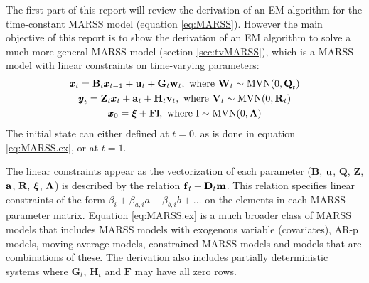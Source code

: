 \documentclass[]{article}
\def\xixi{\mbox{\boldmath $\xi$}}
\def\LAM{\mbox{\boldmath $\Lambda$}}
\def\UPS{\mbox{\boldmath $\Upsilon$}}
\def\XI{\mbox{\boldmath $\Xi$}}
\def\BB{\mbox{$\mathbf B$}}	\def\bb{\mbox{$\mathbf b$}} \def\Bb{\mbox{$\mathbf J$}} \def\Ba{\mbox{$\mathbf L$}} \def\Bm{\UPS}
\def\DD{\mbox{$\mathbf D$}}	\def\dd{\mbox{$\mathbf d$}}
\def\FF{\mbox{$\mathbf F$}} \def\ff{\mbox{$\mathbf f$}}
\def\GG{\mbox{$\mathbf G$}}	\def\gg{\mbox{$\mathbf g$}}
\def\HH{\mbox{$\mathbf H$}}	\def\hh{\mbox{$\mathbf h$}}
\def\QQ{\mbox{$\mathbf Q$}}	 \def\qq{\mbox{$\mathbf q$}} \def\Qb{\mbox{$\mathbf G$}}  \def\Qm{\mathbb{Q}}
\def\RR{\mbox{$\mathbf R$}}	 \def\rr{\mbox{$\mathbf r$}} \def\Rb{\mbox{$\mathbf H$}}	\def\Rm{\mathbb{R}}
\def\VV{\mbox{$\mathbf V$}}	\def\vv{\mbox{$\mathbf v$}}
\def\WW{\mbox{$\mathbf W$}}	\def\ww{\mbox{$\mathbf w$}}
\def\ZZ{\mbox{$\mathbf Z$}}	\def\zz{\mbox{$\mathbf z$}}	\def\Zb{\mbox{$\mathbf M$}} \def\Za{\mbox{$\mathbf N$}} \def\Zm{\XI}
\begin{document}
The first part of this report will review the derivation of an EM algorithm for the time-constant MARSS model (equation \ref{eq:MARSS}).  However the main objective of this report is to show the derivation of an EM algorithm to solve a much more general MARSS model  (section \ref{sec:tvMARSS}), which is a MARSS model with linear constraints on time-varying parameters: 
\begin{equation}\label{eq:MARSS.ex}
\begin{gathered}
\xx_t = \BB_t\xx_{t-1} + \uu_t + \GG_t\ww_t, \text{ where } \WW_t \sim \mathrm{MVN}(0,\QQ_t)\\
\yy_t = \ZZ_t\xx_t + \aa_t + \HH_t\vv_t, \text{ where } \VV_t \sim \mathrm{MVN}(0,\RR_t)\\
\xx_{0} = \xixi + \FF\ll, \text{ where }  \ll \sim \mathrm{MVN}(0,\LAM)
\end{gathered}
\end{equation}
The initial state can either defined at $t=0$, as is done in equation \ref{eq:MARSS.ex}, or at $t=1$.  

The linear constraints appear as the vectorization of each parameter ($\BB$, $\uu$, $\QQ$, $\ZZ$, $\aa$, $\RR$, $\xixi$, $\LAM$) is described by the relation $\ff_t+\DD_t\mm$. This relation  specifies linear constraints of the form $\beta_i + \beta_{a,i} a + \beta_{b,i} b + \dots$ on the elements in each MARSS parameter matrix. Equation \ref{eq:MARSS.ex} is a much broader class of MARSS models that includes MARSS models with exogenous variable (covariates), AR-p models, moving average models, constrained MARSS models and models that are combinations of these. The derivation also includes partially deterministic systems where $\GG_t$, $\HH_t$ and $\FF$ may have all zero rows.
\end{document}
